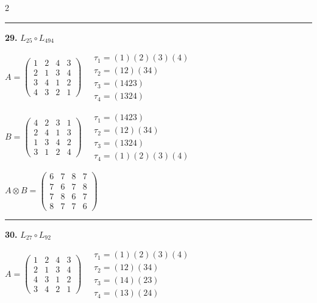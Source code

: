 \begin{multicols}{2}
\vspace{0.3em}
\hrule
\vspace{0.3em}

\noindent\textbf{29.} $L_{25} \circ L_{494}$

$A = \begin{pmatrix} 1 & 2 & 4 & 3 \\ 2 & 1 & 3 & 4 \\ 3 & 4 & 1 & 2 \\ 4 & 3 & 2 & 1 \end{pmatrix} \quad \begin{matrix} \tau_{1}=(1)(2)(3)(4) \\ \tau_{2}=(1 2)(3 4) \\ \tau_{3}=(1 4 2 3) \\ \tau_{4}=(1 3 2 4) \end{matrix}$

$B = \begin{pmatrix} 4 & 2 & 3 & 1 \\ 2 & 4 & 1 & 3 \\ 1 & 3 & 4 & 2 \\ 3 & 1 & 2 & 4 \end{pmatrix} \quad \begin{matrix} \tau_{1}=(1 4 2 3) \\ \tau_{2}=(1 2)(3 4) \\ \tau_{3}=(1 3 2 4) \\ \tau_{4}=(1)(2)(3)(4) \end{matrix}$

$A \otimes B = \begin{pmatrix} 6 & 7 & 8 & 7 \\ 7 & 6 & 7 & 8 \\ 7 & 8 & 6 & 7 \\ 8 & 7 & 7 & 6 \end{pmatrix}$

\vspace{0.3em}
\hrule
\vspace{0.3em}

\noindent\textbf{30.} $L_{27} \circ L_{92}$

$A = \begin{pmatrix} 1 & 2 & 4 & 3 \\ 2 & 1 & 3 & 4 \\ 4 & 3 & 1 & 2 \\ 3 & 4 & 2 & 1 \end{pmatrix} \quad \begin{matrix} \tau_{1}=(1)(2)(3)(4) \\ \tau_{2}=(1 2)(3 4) \\ \tau_{3}=(1 4)(2 3) \\ \tau_{4}=(1 3)(2 4) \end{matrix}$


\end{multicols}
